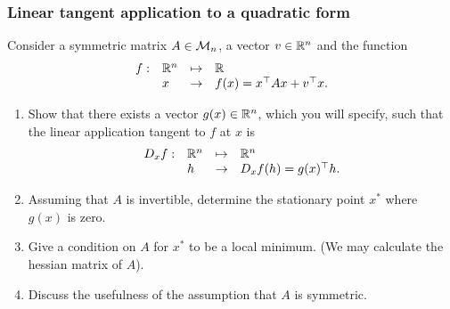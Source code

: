 \subsubsection{Linear tangent application to a quadratic form} 

Consider a symmetric matrix $A \in \mathcal{M}_n$, a vector $v \in \mathbb{R}^n$ and the function 
$$
\begin{array}{rlll}
  f : & \mathbb{R}^n & \mapsto & \mathbb{R} \\
  & x & \to & f(x) = x^\top A x + v^\top x.
\end{array}
$$

\begin{enumerate}
  \item Show that there exists a vector $g(x) \in \mathbb{R}^n$, which you will specify, such that the linear application tangent to $f$ at $x$ is 
  $$
  \begin{array}{rlll}
    D_xf : & \mathbb{R}^n & \mapsto & \mathbb{R}^n \\
    & h & \to & D_xf(h) = g(x)^\top h.
  \end{array}
  $$
  \item Assuming that $A$ is invertible, determine the stationary point $x^*$ where $g(x)$ is zero.
  \item Give a condition on $A$ for $x^*$ to be a local minimum. (We may calculate the hessian matrix of $A$).
  \item Discuss the usefulness of the assumption that $A$ is symmetric.
\end{enumerate}


